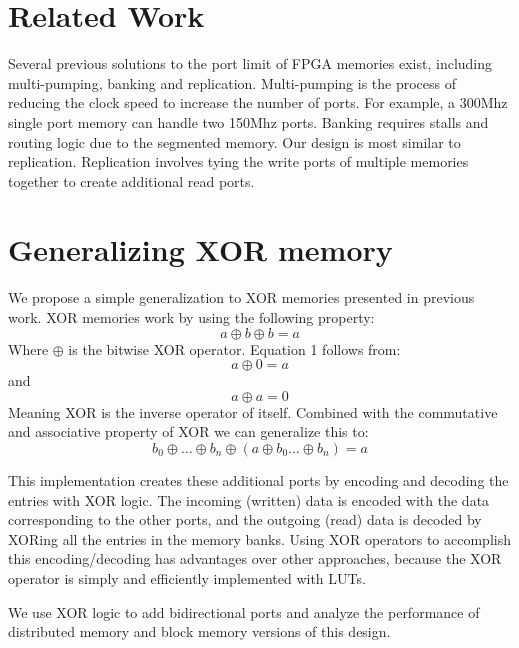 \documentclass[sigconf,nonacm]{acmart}
\begin{document}
\section{Related Work}

Several previous solutions to the port limit of FPGA memories exist, including multi-pumping, banking and replication\cite{laforest10}. Multi-pumping is the process of reducing
the clock speed to increase the number of ports. For example, a 300Mhz single
port memory can handle two 150Mhz ports. Banking\cite{townsend15} requires stalls and routing logic
due to the segmented memory. Our design is most similar to replication. Replication involves tying the write ports of multiple memories together to create additional read ports.

\section{Generalizing XOR memory}

We propose a simple generalization to XOR memories presented in previous work\cite{laforest14}.
XOR memories work by using the following property:
\begin{equation} \label{eqn:xor}
a \oplus b \oplus b = a
\end{equation}
Where $\oplus$ is the bitwise XOR operator. Equation 1 follows from:
\begin{equation}
a \oplus 0 = a
\end{equation}
and
\begin{equation}
a \oplus a = 0
\end{equation}
Meaning XOR is the inverse operator of itself. Combined with the commutative and associative property of XOR we can generalize this to:
\begin{equation}
b_0 \oplus \dots \oplus b_n \oplus (a \oplus b_0 \dots \oplus b_n) = a
\end{equation}

This implementation creates these additional ports by encoding and decoding the entries with XOR logic. The incoming (written) data is encoded with the data corresponding to the other ports, and the outgoing (read) data is decoded by XORing all the entries in the memory banks. Using XOR operators to accomplish this encoding/decoding has advantages over other approaches, because the XOR operator is simply and efficiently implemented with LUTs.

We use XOR logic to add bidirectional
ports and analyze the performance of distributed memory and block memory
versions of this design.
\end{document}
